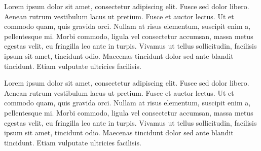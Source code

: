 \documentclass{book}
\begin{document}
\begin{pages}
\begin{Leftside}
\beginnumbering
\pstart
{}Lorem ipsum dolor sit amet, consectetur adipiscing elit. Fusce sed dolor libero. Aenean rutrum vestibulum lacus ut pretium. Fusce et auctor lectus. Ut et commodo quam, quis gravida orci. Nullam at risus elementum, suscipit enim a, pellentesque mi. Morbi commodo, ligula vel consectetur accumsan, massa metus egestas velit, eu fringilla leo ante in turpis. Vivamus ut tellus sollicitudin, facilisis ipsum sit amet, tincidunt odio. Maecenas tincidunt dolor sed ante blandit tincidunt. Etiam vulputate ultricies facilisis.
\pend
\endnumbering




\end{Leftside}
\begin{Rightside}


\beginnumbering
\pstart
{}Lorem ipsum dolor sit amet, consectetur adipiscing elit. Fusce sed dolor libero. Aenean rutrum vestibulum lacus ut pretium. Fusce et auctor lectus. Ut et commodo quam, quis gravida orci. Nullam at risus elementum, suscipit enim a, pellentesque mi. Morbi commodo, ligula vel consectetur accumsan, massa metus egestas velit, eu fringilla leo ante in turpis. Vivamus ut tellus sollicitudin, facilisis ipsum sit amet, tincidunt odio. Maecenas tincidunt dolor sed ante blandit tincidunt. Etiam vulputate ultricies facilisis.
\pend
\endnumbering

\end{Rightside}
\Pages
\end{pages}
\end{document}
